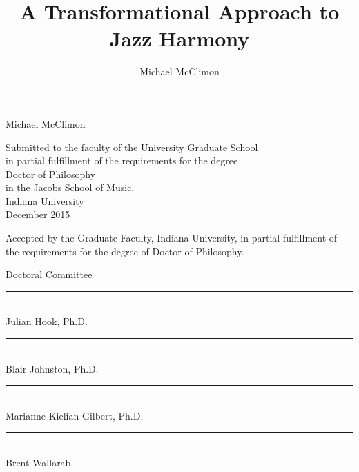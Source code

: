 
\title{A Transformational Approach to Jazz Harmony}
\author{Michael McClimon}
\date{}
\makeatletter \let\Title\@title \makeatother


\begin{center}
  \singlespacing
  \thispagestyle{empty}

  \vspace*{\fill}
  \keepthetitle
  {
    \MakeUppercase{\Title}
  }

  \vspace{\baselineskip}
  Michael McClimon

  \vspace{4\baselineskip}

  Submitted to the faculty of the University Graduate School \\
  in partial fulfillment of the requirements for the degree \\
  Doctor of Philosophy \\
  in the Jacobs School of Music, \\
  Indiana University \\
  December 2015

  \vspace{\fill}
\end{center}
\cleardoublepage

\singlespacing
\begin{center}
  Accepted by the Graduate Faculty, Indiana University, in partial fulfillment
  of the requirements for the degree of Doctor of Philosophy.
\end{center}

{\flushleft
  \vspace{\baselineskip}
  Doctoral Committee
}

{\flushright

\vspace{5em}
\rule{20em}{0.5pt} \\ Julian Hook, Ph.D.

\vspace{5em}
\rule{20em}{0.5pt} \\ Blair Johnston, Ph.D.

\vspace{5em}
\rule{20em}{0.5pt} \\ Marianne Kielian-Gilbert, Ph.D.

\vspace{5em}
\rule{20em}{0.5pt} \\ Brent Wallarab

}



